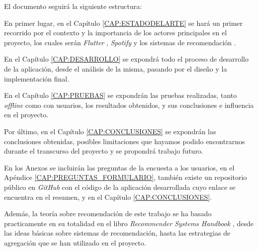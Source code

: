 El documento seguirá la siguiente estructura:

En primer lugar, en el Capítulo \ref{CAP:ESTADODELARTE} se hará un primer recorrido por el contexto y la importancia de los actores principales en el proyecto, los cuales serán
\textit{Flutter} \cite{flutter}, \textit{Spotify} \cite{spotify} y los sistemas de recomendación \cite{recommender_handbook}.

En el Capítulo \ref{CAP:DESARROLLO} se expondrá todo el proceso de desarrollo de la aplicación, desde el análisis 
de la misma, pasando por el diseño y la implementación final.

En el Capítulo \ref{CAP:PRUEBAS} se expondrán las pruebas realizadas, tanto \textit{offline} como con usuarios, 
los resultados obtenidos, y sus conclusiones e influencia en el proyecto.

Por último, en el Capítulo \ref{CAP:CONCLUSIONES} se expondrán las conclusiones obtenidas, posibles limitaciones que hayamos podido encontrarnos
durante el transcurso del proyecto y se propondrá trabajo futuro.

En los Anexos se incluirán las preguntas de la encuesta a los usuarios, en el Apéndice \ref{CAP:PREGUNTAS_FORMULARIO}, también existe un repositorio público en 
\textit{GitHub} con el código de la aplicación desarrollada cuyo enlace se encuentra en el resumen, y en el
Capítulo \ref{CAP:CONCLUSIONES}.

Además, la teoría sobre recomendación de este trabajo se ha basado practicamente en su totalidad en el libro 
\textit{Recommender Systems Handbook} \cite{recommender_handbook}, desde las ideas básicas sobre sistemas de recomendación, 
hasta las estrategias de agregación que se han utilizado en el proyecto.
